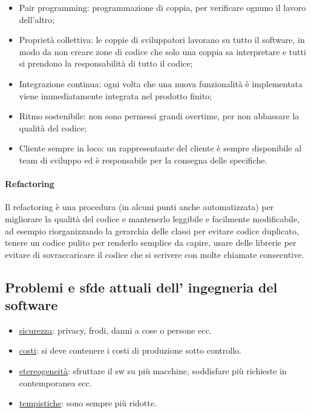 \documentclass[a4paper, 10pt]{article}
\begin{document}
\begin{enumerate}
\begin{itemize}
			\item Pair programming: programmazione di coppia, per verificare ognuno il lavoro dell'altro;
			
			\item Proprietà collettiva: le coppie di sviluppatori lavorano su tutto il software, in modo da non creare zone di codice che solo una coppia sa interpretare e tutti si prendono la responsabilità di tutto il codice;
			
			\item Integrazione continua: ogni volta che una nuova funzionalità è implementata viene immediatamente integrata nel prodotto finito;
			
			\item Ritmo sostenibile: non sono permessi grandi overtime, per non abbassare la qualità del codice;
			
			\item Cliente sempre in loco: un rappresentante del cliente è sempre disponibile al team di sviluppo ed è responsabile per la consegna delle specifiche.
		\end{itemize}
		
		\paragraph{Refactoring} Il refactoring è una procedura (in alcuni punti anche automatizzata) per migliorare la qualità del codice e mantenerlo leggibile e facilmente modificabile, ad esempio riorganizzando la gerarchia delle classi per evitare codice duplicato, tenere un codice pulito per renderlo semplice da capire, usare delle librerie per evitare di sovraccaricare il codice che si scrivere con molte chiamate consecutive.
	\end{enumerate}
	
	\subsection*{Problemi e sfde attuali dell' ingegneria del software}
	
	\begin{itemize}
		\item \underline{sicurezza}: privacy, frodi, danni a cose o persone ecc.
		\item \underline{costi}: si deve contenere i costi di produzione sotto controllo.
		\item \underline{etereogeneità}: sfruttare il sw su più macchine, soddisfare più richieste in
		contemporanea ecc.
		\item \underline{tempistiche}: sono sempre più ridotte.
	\end{itemize}
	
\end{document}
